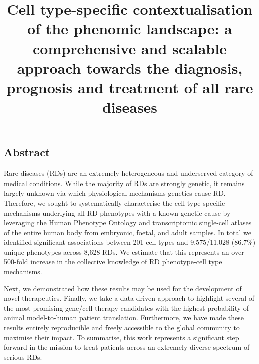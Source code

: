 \documentclass[
]{agujournal2019}
\begin{document}
\title{Cell type-specific contextualisation of the phenomic landscape: a
comprehensive and scalable approach towards the diagnosis, prognosis and
treatment of all rare diseases}







\newpage{}

\subsection{Abstract}\label{abstract}

Rare diseases (RDs) are an extremely heterogeneous and underserved
category of medical conditions. While the majority of RDs are strongly
genetic, it remains largely unknown via which physiological mechanisms
genetics cause RD. Therefore, we sought to systematically characterise
the cell type-specific mechanisms underlying all RD phenotypes with a
known genetic cause by leveraging the Human Phenotype Ontology and
transcriptomic single-cell atlases of the entire human body from
embryonic, foetal, and adult samples. In total we identified significant
associations between 201 cell types and 9,575/11,028 (86.7\%) unique
phenotypes across 8,628 RDs. We estimate that this represents an over
500-fold increase in the collective knowledge of RD phenotype-cell type
mechanisms.

Next, we demonstrated how these results may be used for the development
of novel therapeutics. Finally, we take a data-driven approach to
highlight several of the most promising gene/cell therapy candidates
with the highest probability of animal model-to-human patient
translation. Furthermore, we have made these results entirely
reproducible and freely accessible to the global community to maximise
their impact. To summarise, this work represents a significant step
forward in the mission to treat patients across an extremely diverse
spectrum of serious RDs.
\end{document}
